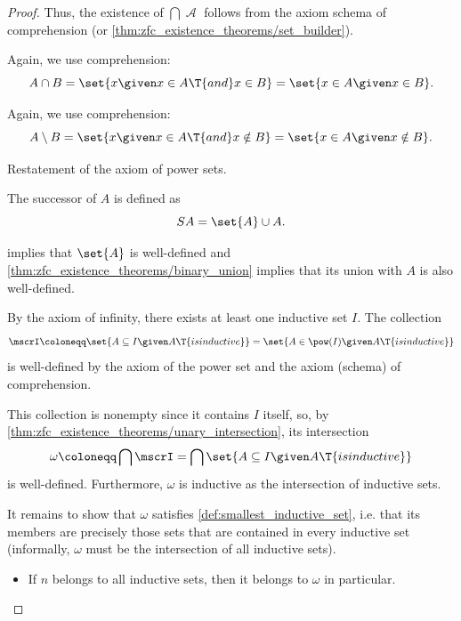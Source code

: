 \begin{proof}
  Thus, the existence of \( \bigcap \mscrA \) follows from the axiom schema of comprehension (or \cref{thm:zfc_existence_theorems/set_builder}).

   Again, we use comprehension:
  \begin{equation*}
    A \cap B = \set{ x \given x \in A \T{and} x \in B } = \set{ x \in A \given x \in B }.
  \end{equation*}

   Again, we use comprehension:
  \begin{equation*}
    A \setminus B = \set{ x \given x \in A \T{and} x \notin B } = \set{ x \in A \given x \notin B }.
  \end{equation*}

   Restatement of the axiom of power sets.

   The successor of \( A \) is defined as
  \begin{equation*}
    SA = \set{ A } \cup A.
  \end{equation*}

   implies that \( \set{ A } \) is well-defined and \cref{thm:zfc_existence_theorems/binary_union} implies that its union with \( A \) is also well-defined.

   By the axiom of infinity, there exists at least one inductive set \( I \). The collection
  \begin{equation*}
    \mscrI \coloneqq \set{ A \subseteq I \given A \T{is inductive} } = \set{ A \in \pow(I) \given A \T{is inductive} }
  \end{equation*}
  is well-defined by the axiom of the power set and the axiom (schema) of comprehension.

  This collection is nonempty since it contains \( I \) itself, so, by \cref{thm:zfc_existence_theorems/unary_intersection}, its intersection
  \begin{equation*}
    \omega \coloneqq \bigcap \mscrI = \bigcap \set{ A \subseteq I \given A \T{is inductive} }
  \end{equation*}
  is well-defined. Furthermore, \( \omega \) is inductive as the intersection of inductive sets.

  It remains to show that \( \omega \) satisfies \cref{def:smallest_inductive_set}, i.e. that its members are precisely those sets that are contained in every inductive set (informally, \( \omega \) must be the intersection of all inductive sets).
  \begin{itemize}
    \item If \( n \) belongs to all inductive sets, then it belongs to \( \omega \) in particular.


\end{itemize}
\end{proof}
